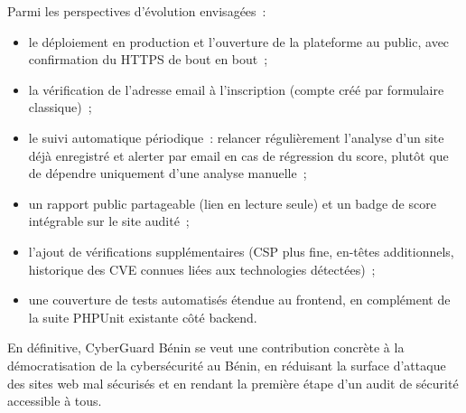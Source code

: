 Parmi les perspectives d'\'evolution envisag\'ees~:
\begin{itemize}
  \item le d\'eploiement en production et l'ouverture de la plateforme au
    public, avec confirmation du HTTPS de bout en bout~;
  \item la v\'erification de l'adresse email \`a l'inscription (compte cr\'e\'e par
    formulaire classique)~;
  \item le suivi automatique p\'eriodique~: relancer r\'eguli\`erement l'analyse
    d'un site d\'ej\`a enregistr\'e et alerter par email en cas de r\'egression du
    score, plut\^ot que de d\'ependre uniquement d'une analyse manuelle~;
  \item un rapport public partageable (lien en lecture seule) et un badge de
    score int\'egrable sur le site audit\'e~;
  \item l'ajout de v\'erifications suppl\'ementaires (CSP plus fine, en-t\^etes
    additionnels, historique des CVE connues li\'ees aux technologies
    d\'etect\'ees)~;
  \item une couverture de tests automatis\'es \'etendue au frontend, en
    compl\'ement de la suite PHPUnit existante c\^ot\'e backend.
\end{itemize}

En d\'efinitive, CyberGuard B\'enin se veut une contribution concr\`ete \`a la
d\'emocratisation de la cybers\'ecurit\'e au B\'enin, en r\'eduisant la surface
d'attaque des sites web mal s\'ecuris\'es et en rendant la premi\`ere \'etape d'un
audit de s\'ecurit\'e accessible \`a tous.
